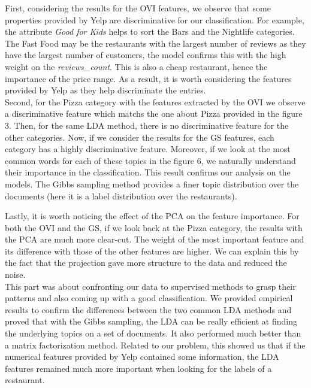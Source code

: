 \documentclass[twoside]{article}
\begin{document}
\begin{multicols}{2}
\noindent First, considering the results for the OVI features, we observe that some properties provided by Yelp are discriminative for our classification. For example, the attribute \textit{Good for Kids} helps to sort the Bars and the Nightlife categories. The Fast Food may be the restaurants with the largest number of reviews as they have the largest number of customers, the model confirms this with the high weight on the \textit{reviews\_count}. This is also a cheap restaurant, hence the importance of the price range. As a result, it is worth considering the features provided by Yelp as they help discriminate the entries.\\

\noindent Second, for the Pizza category with the features extracted by the OVI we observe a discriminative feature which matchs the one about Pizza provided in the figure 3. Then, for the same LDA method, there is no discriminative feature for the other categories. Now, if we consider the results for the GS features, each category has a highly discriminative feature. Moreover, if we look at the most common words for each of these topics in the figure 6, we naturally understand their importance in the classification. This result confirms our analysis on the models. The Gibbs sampling method provides a finer topic distribution over the documents (here it is a label distribution over the restaurants).

\noindent Lastly, it is worth noticing the effect of the PCA on the feature importance. For both the OVI and the GS, if we look back at the Pizza category, the results with the PCA are much more clear-cut. The weight of the most important feature and its difference with those of the other features are higher. We can explain this by the fact that the projection gave more structure to the data and reduced the noise.\\

\noindent This part was about confronting our data to supervised methods to grasp their patterns and also coming up with a good classification. We provided empirical results to confirm the differences between the two common LDA methods and proved that with the Gibbs sampling, the LDA can be really efficient at finding the underlying topics on a set of documents. It also performed much better than a matrix factorization method. Related to our problem, this showed us that if the numerical features provided by Yelp contained some information, the LDA features remained much more important when looking for the labels of a restaurant.


\end{multicols}
\end{document}
